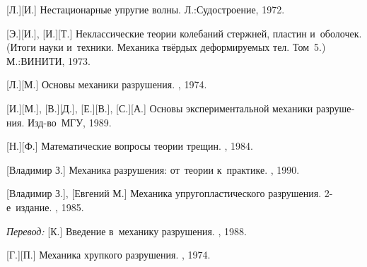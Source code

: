 \begin{thebibliography}{123}
\begin{otherlanguage}{russian}
[Л.][И.] Нестационарные упругие волны. Л.:\;Судостроение, 1972. 

[Э.][И.], [И.][Т.] Неклассические теории колебаний стержней, пластин и~оболочек. (Итоги науки и~техники. Механика твёрдых деформируемых тел. Том~5.) М.:\;ВИНИТИ, 1973. 

%
%



[Л.][М.]
Основы механики разрушения.
\naukapublisher, 1974.

[И.][М.],
[В.][Д.],
[Е.][В.],
[С.][А.]
Основы экспериментальной механики разрушения.
Изд\hbox{-}во~МГУ, 1989.

[Н.][Ф.]
Математические вопросы теории трещин.
\naukapublisher, 1984.

[Владимир З.]
Механика разрушения: от~теории к~практике.
\naukapublisher, 1990.

[Владимир З.], [Евгений М.]
Механика упругопластического разрушения.
2\hbox{-}е~издание. \naukapublisher, 1985.

\emph{Перевод:}
[К.]
Введение в~механику разрушения.
\mirpublisher, 1988.

[Г.][П.]
Механика хрупкого разрушения.
\naukapublisher, 1974.


\end{otherlanguage}
\end{thebibliography}

